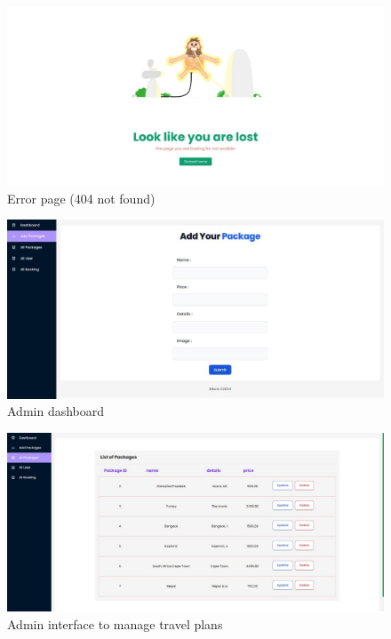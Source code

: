 \documentclass{scrreprt}
\begin{document}
\begin{figure}[h!]
    \centering
    \includegraphics[width=1.1\textwidth, height=0.4\textheight]{./SS/error.jpg}
    \caption{Error page (404 not found)}
    \label{fig:error}
\end{figure}

\begin{figure}[h!]
    \centering
    \includegraphics[width=1.1\textwidth, height=0.4\textheight]{./SS/admin.jpg}
    \caption{Admin dashboard}
    \label{fig:admin}
\end{figure}

\begin{figure}[h!]
    \centering
    \includegraphics[width=1.1\textwidth, height=0.4\textheight]{./SS/manage_plan.jpg}
    \caption{Admin interface to manage travel plans}
    \label{fig:manage_plan}
\end{figure}
\end{document}
